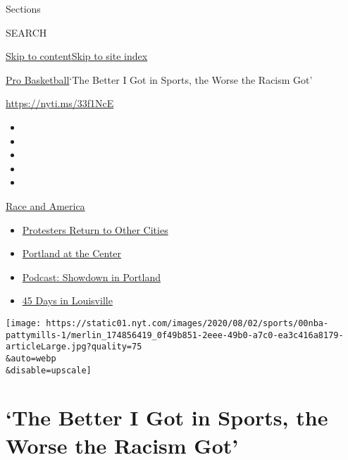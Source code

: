 Sections

SEARCH

\protect\hyperlink{site-content}{Skip to
content}\protect\hyperlink{site-index}{Skip to site index}

\href{/section/sports/basketball}{Pro Basketball}\textbar{}`The Better I
Got in Sports, the Worse the Racism Got'

\url{https://nyti.ms/33f1NcE}

\begin{itemize}
\item
\item
\item
\item
\item
\end{itemize}

\href{https://www.nytimes.com/news-event/george-floyd-protests-minneapolis-new-york-los-angeles?action=click\&pgtype=Article\&state=default\&region=TOP_BANNER\&context=storylines_menu}{Race
and America}

\begin{itemize}
\tightlist
\item
  \href{https://www.nytimes.com/2020/07/26/us/protests-portland-seattle-trump.html?action=click\&pgtype=Article\&state=default\&region=TOP_BANNER\&context=storylines_menu}{Protesters
  Return to Other Cities}
\item
  \href{https://www.nytimes.com/2020/07/24/us/portland-oregon-protests-white-race.html?action=click\&pgtype=Article\&state=default\&region=TOP_BANNER\&context=storylines_menu}{Portland
  at the Center}
\item
  \href{https://www.nytimes.com/2020/07/23/podcasts/the-daily/portland-protests.html?action=click\&pgtype=Article\&state=default\&region=TOP_BANNER\&context=storylines_menu}{Podcast:
  Showdown in Portland}
\item
  \href{https://www.nytimes.com/interactive/2020/07/16/us/black-lives-matter-protests-louisville-breonna-taylor.html?action=click\&pgtype=Article\&state=default\&region=TOP_BANNER\&context=storylines_menu}{45
  Days in Louisville}
\end{itemize}

\texttt{[image: https://static01.nyt.com/images/2020/08/02/sports/00nba-pattymills-1/merlin\_174856419\_0f49b851-2eee-49b0-a7c0-ea3c416a8179-articleLarge.jpg?quality=75\\\&auto=webp\\\&disable=upscale]}

\hypertarget{the-better-i-got-in-sports-the-worse-the-racism-got}{%
\section{`The Better I Got in Sports, the Worse the Racism
Got'}\label{the-better-i-got-in-sports-the-worse-the-racism-got}}

